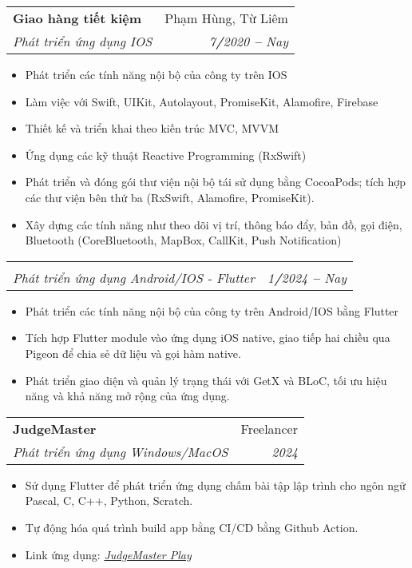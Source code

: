\documentclass[letterpaper,11pt]{article}
\makeatletter
\newcommand{\resumeItem}[1]{
  \item\small{
    {#1 \vspace{-2pt}}
  }
}
\newcommand{\resumeSubheading}[4]{
  \vspace{-2pt}\item
    \begin{tabular*}{0.97\textwidth}[t]{l@{\extracolsep{\fill}}r}
      \textbf{#1} & #2 \\
      \textit{\small#3} & \textit{\small #4} \\
    \end{tabular*}\vspace{-7pt}
}
\newcommand{\resumeItemListStart}{\begin{itemize}}
\newcommand{\resumeItemListEnd}{\end{itemize}\vspace{-5pt}}
\makeatother
\begin{document}
    \resumeSubheading
      {Giao hàng tiết kiệm}{Phạm Hùng, Từ Liêm}
      {Phát triển ứng dụng IOS}{7\textbf{/}2020 \textbf{--} Nay}
        \resumeItemListStart
            \resumeItem{Phát triển các tính năng nội bộ của công ty trên IOS}
            \resumeItem{Làm việc với Swift, UIKit, Autolayout, PromiseKit, Alamofire, Firebase}
            \resumeItem{Thiết kế và triển khai theo kiến trúc MVC, MVVM}
            \resumeItem{Ứng dụng các kỹ thuật Reactive Programming (RxSwift)}
            \resumeItem{Phát triển và đóng gói thư viện nội bộ tái sử dụng bằng CocoaPods; tích hợp các thư viện bên thứ ba (RxSwift, Alamofire, PromiseKit).}
            \resumeItem{Xây dựng các tính năng như theo dõi vị trí, thông báo đẩy, bản đồ, gọi điện, Bluetooth (CoreBluetooth, MapBox, CallKit, Push Notification)}
        \resumeItemListEnd
    \resumeSubheading
      {}{}
      {Phát triển ứng dụng Android/IOS - Flutter}{1\textbf{/}2024 \textbf{--} Nay}
        \resumeItemListStart
            \resumeItem{Phát triển các tính năng nội bộ của công ty trên Android/IOS bằng Flutter}
            \resumeItem{Tích hợp Flutter module vào ứng dụng iOS native, giao tiếp hai chiều qua Pigeon để chia sẻ dữ liệu và gọi hàm native.}
            \resumeItem{Phát triển giao diện và quản lý trạng thái với GetX và BLoC, tối ưu hiệu năng và khả năng mở rộng của ứng dụng.}
        \resumeItemListEnd
    
    \resumeSubheading
      {JudgeMaster}{Freelancer}
      {Phát triển ứng dụng Windows/MacOS}{2024}
        \resumeItemListStart
            \resumeItem{Sử dụng Flutter để phát triển ứng dụng chấm bài tập lập trình cho ngôn ngữ Pascal, C, C++, Python, Scratch.}
            \resumeItem{Tự động hóa quá trình build app bằng CI/CD bằng Github Action.}
            \resumeItem{Link ứng dụng: \emph{\href{https://www.judgemaster.com}{\color{blue}JudgeMaster Play}}}
    \resumeItemListEnd
    
\end{document}
